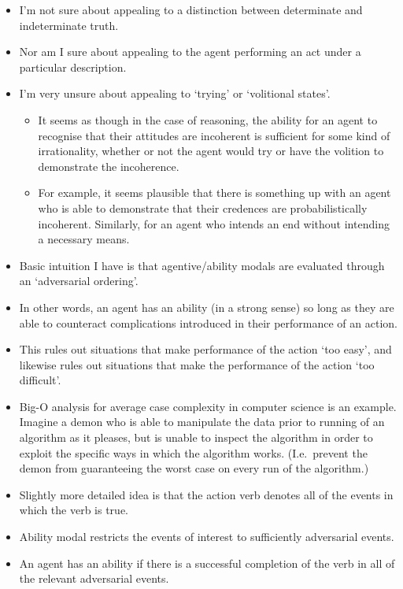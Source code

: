 \documentclass[10pt]{article}
\begin{document}
\begin{itemize}
\item I'm not sure about appealing to a distinction between determinate and indeterminate truth.
\item Nor am I sure about appealing to the agent performing an act under a particular description.
\item I'm very unsure about appealing to `trying' or `volitional states'.
  \begin{itemize}
  \item It seems as though in the case of reasoning, the ability for an agent to recognise that their attitudes are incoherent is sufficient for some kind of irrationality, whether or not the agent would try or have the volition to demonstrate the incoherence.
  \item For example, it seems plausible that there is something up with an agent who is able to demonstrate that their credences are probabilistically incoherent.
    Similarly, for an agent who intends an end without intending a necessary means.
  \end{itemize}
\end{itemize}

\begin{itemize}
\item Basic intuition I have is that agentive/ability modals are evaluated through an `adversarial ordering'.
\item In other words, an agent has an ability (in a strong sense) so long as they are able to counteract complications introduced in their performance of an action.
\item This rules out situations that make performance of the action `too easy', and likewise rules out situations that make the performance of the action `too difficult'.
\item Big-O analysis for average case complexity in computer science is an example.
  Imagine a demon who is able to manipulate the data prior to running of an algorithm as it pleases, but is unable to inspect the algorithm in order to exploit the specific ways in which the algorithm works.
  (I.e.\ prevent the demon from guaranteeing the worst case on every run of the algorithm.)
\end{itemize}

\begin{itemize}
\item Slightly more detailed idea is that the action verb denotes all of the events in which the verb is true.
\item Ability modal restricts the events of interest to sufficiently adversarial events.
\item An agent has an ability if there is a successful completion of the verb in all of the relevant adversarial events.
\end{itemize}
\end{document}
